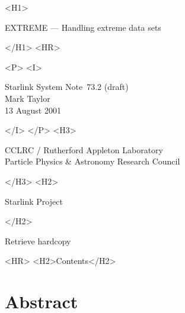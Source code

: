 \documentclass[twoside,11pt]{article}
\newcommand{\stardoccategory}  {Starlink System Note}
\newcommand{\stardocsource}    {ssn\stardocnumber}
\newcommand{\stardocnumber}    {73.2 (draft)}
\newcommand{\stardocauthors}   {Mark Taylor}
\newcommand{\stardocdate}      {13 August 2001}
\newcommand{\stardoctitle}     {EXTREME --- Handling extreme data sets}
\newcommand{\htmladdnormallink}[2]{#1}
\newcommand{\htmladdimg}[1]{}
\newcommand{\htmlref}[2]{#1}
\newcommand{\htmladdtonavigation}[1]{}
\newcommand{\xlabel}[1]{}
\renewcommand{\_}{\texttt{\symbol{95}}}
\begin{document}
\begin{htmlonly}
   \xlabel{}
   \begin{rawhtml} <H1> \end{rawhtml}
      \stardoctitle
   \begin{rawhtml} </H1> <HR> \end{rawhtml}

   \begin{rawhtml} <P> <I> \end{rawhtml}
   \stardoccategory\ \stardocnumber \\
   \stardocauthors \\
   \stardocdate
   \begin{rawhtml} </I> </P> <H3> \end{rawhtml}
      \htmladdnormallink{CCLRC / Rutherford Appleton Laboratory}
                        {http://www.cclrc.ac.uk} \\
      \htmladdnormallink{Particle Physics \& Astronomy Research Council}
                        {http://www.pparc.ac.uk} \\
   \begin{rawhtml} </H3> <H2> \end{rawhtml}
      \htmladdnormallink{Starlink Project}{http://www.starlink.rl.ac.uk/}
   \begin{rawhtml} </H2> \end{rawhtml}
   \htmladdnormallink{\htmladdimg{source.gif} Retrieve hardcopy}
      {http://www.starlink.rl.ac.uk/cgi-bin/hcserver?\stardocsource}\\

  \label{stardoccontents}
  \begin{rawhtml} 
    <HR>
    <H2>Contents</H2>
  \end{rawhtml}
  \htmladdtonavigation{\htmlref{\htmladdimg{contents_motif.gif}}
        {stardoccontents}}

  \section{\xlabel{abstract}Abstract}

\end{htmlonly}
\end{document}
